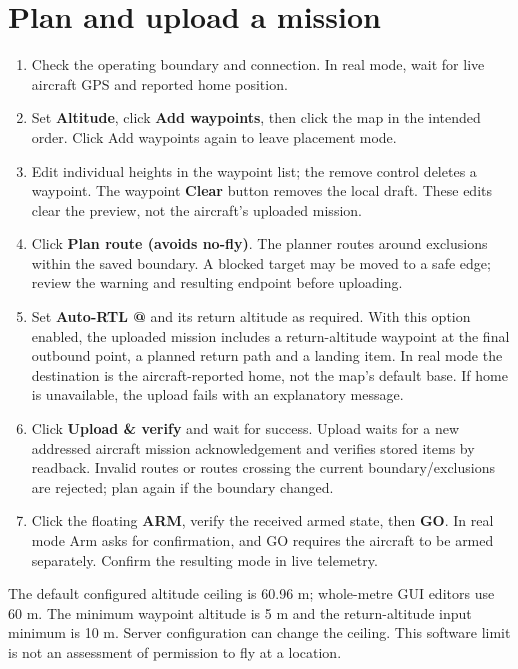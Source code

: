\documentclass[11pt]{article}
\begin{document}
\section{Plan and upload a mission}
\begin{enumerate}[leftmargin=1.6em]
  \item Check the operating boundary and connection. In real mode, wait for live
    aircraft GPS and reported home position.
  \item Set \textbf{Altitude}, click \textbf{Add waypoints}, then click the map in
    the intended order. Click Add waypoints again to leave placement mode.
  \item Edit individual heights in the waypoint list; the remove control deletes
    a waypoint. The waypoint \textbf{Clear} button removes the local draft.
    These edits clear the preview, not the aircraft's uploaded mission.
  \item Click \textbf{Plan route (avoids no-fly)}. The planner routes around
    exclusions within the saved boundary. A blocked target may be moved to a safe
    edge; review the warning and resulting endpoint before uploading.
  \item Set \textbf{Auto-RTL @} and its return altitude as required. With this
    option enabled, the uploaded mission includes a return-altitude waypoint at
    the final outbound point, a planned return path and a landing item. In real
    mode the destination is the aircraft-reported home, not the map's default base.
    If home is unavailable, the upload fails with an explanatory message.
  \item Click \textbf{Upload \& verify} and wait for success. Upload waits for a new
    addressed aircraft mission acknowledgement and verifies stored items by readback. Invalid routes or routes crossing the
    current boundary/exclusions are rejected; plan again if the boundary changed.
  \item Click the floating \textbf{ARM}, verify the received armed state, then \textbf{GO}.
    In real mode Arm asks for confirmation, and GO requires the aircraft to be
    armed separately. Confirm the resulting mode in live telemetry.
\end{enumerate}

The default configured altitude ceiling is 60.96 m; whole-metre GUI editors use
60 m. The minimum waypoint altitude is 5 m and the return-altitude input minimum
is 10 m. Server configuration can change the ceiling. This software limit is not
an assessment of permission to fly at a location.
\end{document}
